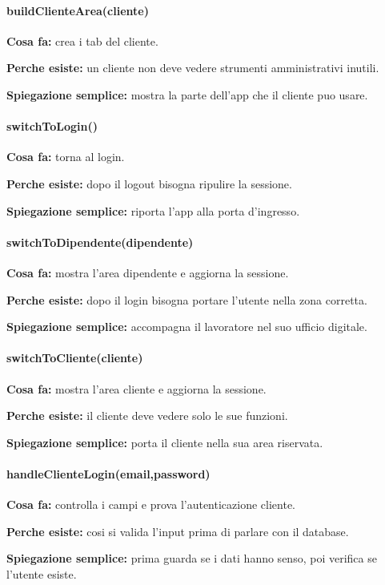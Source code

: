 \documentclass[12pt,a4paper]{article}
\begin{document}
\paragraph{buildClienteArea(cliente)}
\textbf{Cosa fa:} crea i tab del cliente.

\textbf{Perche esiste:} un cliente non deve vedere strumenti amministrativi inutili.

\textbf{Spiegazione semplice:} mostra la parte dell'app che il cliente puo usare.

\paragraph{switchToLogin()}
\textbf{Cosa fa:} torna al login.

\textbf{Perche esiste:} dopo il logout bisogna ripulire la sessione.

\textbf{Spiegazione semplice:} riporta l'app alla porta d'ingresso.

\paragraph{switchToDipendente(dipendente)}
\textbf{Cosa fa:} mostra l'area dipendente e aggiorna la sessione.

\textbf{Perche esiste:} dopo il login bisogna portare l'utente nella zona corretta.

\textbf{Spiegazione semplice:} accompagna il lavoratore nel suo ufficio digitale.

\paragraph{switchToCliente(cliente)}
\textbf{Cosa fa:} mostra l'area cliente e aggiorna la sessione.

\textbf{Perche esiste:} il cliente deve vedere solo le sue funzioni.

\textbf{Spiegazione semplice:} porta il cliente nella sua area riservata.

\paragraph{handleClienteLogin(email,password)}
\textbf{Cosa fa:} controlla i campi e prova l'autenticazione cliente.

\textbf{Perche esiste:} cosi si valida l'input prima di parlare con il database.

\textbf{Spiegazione semplice:} prima guarda se i dati hanno senso, poi verifica se l'utente esiste.
\end{document}
